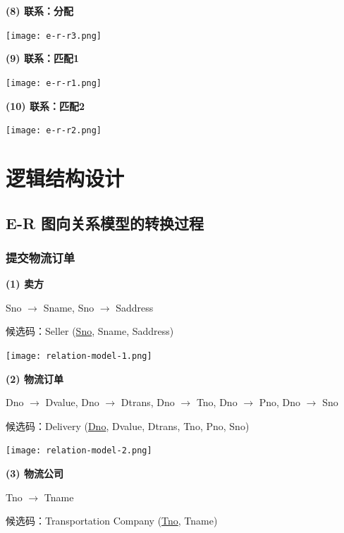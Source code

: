 \documentclass[12pt]{article}
\begin{document}
\noindent \textbf{(8) 联系：分配}

\begin{center}
	\texttt{[image: e-r-r3.png]}
\end{center}

\noindent \textbf{(9) 联系：匹配1}

\begin{center}
	\texttt{[image: e-r-r1.png]}
\end{center}

\noindent \textbf{(10) 联系：匹配2}

\begin{center}
	\texttt{[image: e-r-r2.png]}
\end{center}

\section{逻辑结构设计}

\subsection{E-R 图向关系模型的转换过程}

\subsubsection{提交物流订单}

\noindent \textbf{(1) 卖方} \par 
\noindent Sno $\rightarrow$ Sname, Sno $\rightarrow$ Saddress \par 
\noindent 候选码：Seller (\uline{Sno}, Sname, Saddress) 

\begin{center}
	\texttt{[image: relation-model-1.png]}
\end{center}

\noindent \textbf{(2) 物流订单} \par 
\noindent Dno $\rightarrow$ Dvalue, Dno $\rightarrow$ Dtrans, Dno $\rightarrow$ Tno, Dno $\rightarrow$ Pno, Dno $\rightarrow$ Sno \par 
\noindent 候选码：Delivery (\uline{Dno}, Dvalue, Dtrans, Tno, Pno, Sno)

\begin{center}
	\texttt{[image: relation-model-2.png]}
\end{center}

\noindent \textbf{(3) 物流公司} \par 
\noindent Tno $\rightarrow$ Tname \par 
\noindent 候选码：Transportation Company (\uline{Tno}, Tname)
\end{document}
